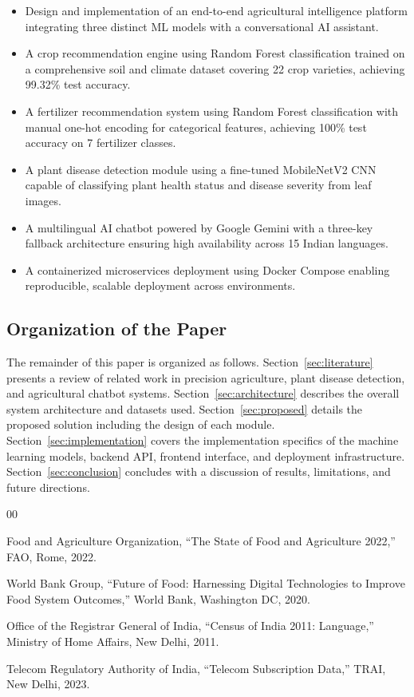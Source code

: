 \documentclass[conference]{IEEEtran}
\begin{document}
\begin{itemize}
    \item Design and implementation of an end-to-end agricultural intelligence platform integrating three distinct ML models with a conversational AI assistant.
    \item A crop recommendation engine using Random Forest classification trained on a comprehensive soil and climate dataset covering 22 crop varieties, achieving 99.32\% test accuracy.
    \item A fertilizer recommendation system using Random Forest classification with manual one-hot encoding for categorical features, achieving 100\% test accuracy on 7 fertilizer classes.
    \item A plant disease detection module using a fine-tuned MobileNetV2 CNN capable of classifying plant health status and disease severity from leaf images.
    \item A multilingual AI chatbot powered by Google Gemini with a three-key fallback architecture ensuring high availability across 15 Indian languages.
    \item A containerized microservices deployment using Docker Compose enabling reproducible, scalable deployment across environments.
\end{itemize}

\subsection{Organization of the Paper}

The remainder of this paper is organized as follows. Section~\ref{sec:literature} presents a review of related work in precision agriculture, plant disease detection, and agricultural chatbot systems. Section~\ref{sec:architecture} describes the overall system architecture and datasets used. Section~\ref{sec:proposed} details the proposed solution including the design of each module. Section~\ref{sec:implementation} covers the implementation specifics of the machine learning models, backend API, frontend interface, and deployment infrastructure. Section~\ref{sec:conclusion} concludes with a discussion of results, limitations, and future directions.

\begin{thebibliography}{00}

 Food and Agriculture Organization, ``The State of Food and Agriculture 2022,'' FAO, Rome, 2022.

 World Bank Group, ``Future of Food: Harnessing Digital Technologies to Improve Food System Outcomes,'' World Bank, Washington DC, 2020.

 Office of the Registrar General of India, ``Census of India 2011: Language,'' Ministry of Home Affairs, New Delhi, 2011.

 Telecom Regulatory Authority of India, ``Telecom Subscription Data,'' TRAI, New Delhi, 2023.

\end{thebibliography}
\end{document}
